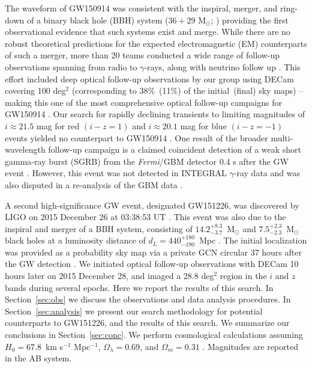 The waveform of GW150914 was consistent with the inspiral, merger,
and ring-down of a binary black hole (BBH) system ($36+29$ M$_\odot$; 
\citealt{abb+16a}) providing the first observational
evidence that such systems exist and merge. While there are no robust
theoretical predictions for the expected electromagnetic (EM)
counterparts of such a merger, more than 20 teams conducted a wide
range of follow-up observations spanning from radio to $\gamma$-rays, along with neutrino follow up
\citep{abb+16b, adrian+16, annis+16, conn+16, evans+16, kasliwal+16, sav+16, smartt+16, ss+16, tavani+16}.
This effort included deep optical follow-up observations by our group using DECam covering 100 deg$^2$
(corresponding to 38\%~(11\%) of the initial~(final) sky maps)
 -- making this one of the most comprehensive optical 
follow-up campaigns for GW150914 \citep{ss+16,annis+16}. Our search for rapidly
declining transients to limiting magnitudes of $i\approx21.5$ mag
for red $(i-z=1)$ and $i\approx20.1$ mag for blue $(i-z=-1)$ events yielded no counterpart to
GW150914 \citep{ss+16}. One result of the broader multi-wavelength
follow-up campaign is a claimed coincident detection of a weak short
gamma-ray burst (SGRB) from the {\it Fermi}/GBM detector 0.4 s after
the GW event \citep{conn+16}. However, this event was not
detected in INTEGRAL $\gamma$-ray data \citep{sav+16} and was also
disputed in a re-analysis of the GBM data \citep{greiner+16}.

A second high-significance GW event, designated GW151226, was
discovered by LIGO on 2015 December 26 at 03:38:53 UT \citep{abb+16c}. 
This event was also due to the inspiral and merger of a BBH system, consisting 
of $14.2^{+8.3}_{-3.7}$~M$_\odot$ and $7.5^{+2.3}_{-2.3}$~M$_\odot$ black holes at a luminosity 
distance of $d_L = 440^{+180}_{-190}$~Mpc \citep{abb+16c}.
The initial localization was provided as a probability sky map via a private 
GCN circular 37 hours after the GW detection \citep{sing+15}. We initiated
optical follow-up observations with DECam 10 hours later on 2015 December 28,
and imaged a 28.8 deg$^2$ region in the $i$ and $z$ bands during several epochs. Here we report 
the results of this search. In Section~\ref{sec:obs} we discuss the
observations and data analysis procedures. In Section~\ref{sec:analysis} 
we present our search methodology for potential counterparts to GW151226, 
and the results of this search. We summarize our conclusions in Section~\ref{sec:conc}. We perform 
cosmological calculations assuming $H_0 = 67.8$~km  s$^{-1}$ Mpc$^{-1}$,
$\Omega_{\lambda} = 0.69$, and $\Omega_m = 0.31$ \citep{planck15}. 
 Magnitudes are reported in the AB system. 

